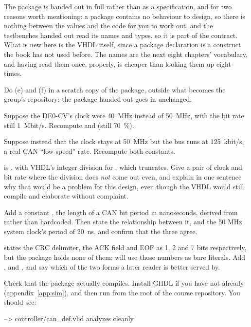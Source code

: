 The package is handed out in full rather than as a specification, and for two reasons worth
mentioning: a package contains no behaviour to design, so there is nothing between the values and
the code for you to work out, and the testbenches handed out read its names and types, so it is part
of the contract. What is new here is the VHDL itself, since a package declaration is a construct the
book has not used before. The names are the next eight chapters' vocabulary, and having read them
once, properly, is cheaper than looking them up eight times.

Do (e) and (f) in a scratch copy of the package, outside what becomes the group's repository: the
package handed out goes in unchanged.

 Suppose the DE0-CV's clock were 40~MHz instead of 50~MHz, with the bit rate still
1~Mbit/s. Recompute  and  (still 70~\%).

 Suppose instead that the clock stays at 50~MHz but the bus runs at 125~kbit/s, a real CAN
``low speed'' rate. Recompute both constants.

  is , with VHDL's integer division
for , which truncates. Give a pair of clock and bit rate where the division does
\emph{not} come out even, and explain in one sentence why that would be a problem for this design,
even though the VHDL would still compile and elaborate without complaint.

 Add a constant , the length of a CAN bit period in nanoseconds, derived
from  rather than hardcoded. Then state the relationship between it,
 and the 50 MHz system clock's period of 20~ns, and confirm that the three agree.

  states the CRC delimiter, the ACK field and EOF as 1, 2 and 7
bits respectively, but the package holds none of them:  will use those numbers
as bare literals. Add ,  and , and say which of the
two forms a later reader is better served by.

 Check that the package actually compiles. Install GHDL if you have not already
(appendix~\ref{app:sim}), and then run  from the root of the course
repository. You should see:

\begin{console}
--> controller/can_def.vhd analyzes cleanly
\end{console}

